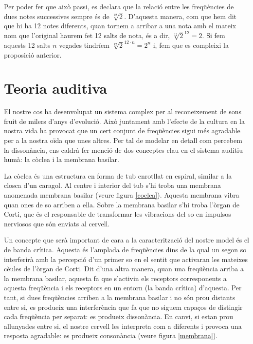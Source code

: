 \documentclass{article}
\theoremstyle{definition}
\newcommand{\0}{\ensuremath{\vb{0}}}
\begin{document}
Per poder fer que això passi, es declara que la relació entre les freqüències de dues notes successives sempre és de $\sqrt[12]{2}$\footnotemark\space. D'aquesta manera, com que hem dit que hi ha 12 notes diferents, quan tornem a arribar a una nota amb el mateix nom que l'original haurem fet 12 salts de nota, és a dir, $\sqrt[12]{2}^{12} = 2$. Si fem aquests 12 salts $n$ vegades tindríem $\sqrt[12]{2}^{12\cdot n} = 2^n$ i, fem que es compleixi la proposició anterior.
\section{Teoria auditiva}\label{teoria_auditiva}
El nostre cos ha desenvolupat un sistema complex per al reconeixement de sons fruit de milers d'anys d'evolució. Això juntament amb l'efecte de la cultura en la nostra vida ha provocat que un cert conjunt de freqüències sigui més agradable per a la nostra oïda que unes altres. Per tal de modelar en detall com percebem la dissonància, ens caldrà fer menció de dos conceptes clau en el sistema auditiu humà: la còclea i la membrana basilar. \par
La còclea és una estructura en forma de tub enrotllat en espiral, similar a la closca d'un caragol. Al centre i interior del tub s'hi troba una membrana anomenada membrana basilar (veure figura \ref{coclea}). Aquesta membrana vibra quan ones de so arriben a ella. Sobre la membrana basilar s'hi troba l'òrgan de Corti, que és el responsable de transformar les vibracions del so en impulsos nerviosos que són enviats al cervell.\par
Un concepte que serà important de cara a la caracterització del nostre model és el de banda crítica. Aquesta és l'amplada de freqüències dins de la qual un segon so interferirà amb la percepció d'un primer so en el sentit que activaran les mateixes cè\lgem ules de l'òrgan de Corti. Dit d'una altra manera, quan una freqüència arriba a la membrana basilar, aquesta fa que s'activin els receptors corresponents a aquesta freqüència i els receptors en un entorn (la banda crítica) d'aquesta. Per tant, si dues freqüències arriben a la membrana basilar i no són prou distants entre si, es produeix una interferència que fa que no siguem capaços de distingir cada freqüència per separat: es produeix dissonància. En canvi, si estan prou allunyades entre si, el nostre cervell les interpreta com a diferents i provoca una resposta agradable: es produeix consonància (veure figura \ref{membrana}).\par
\end{document}
